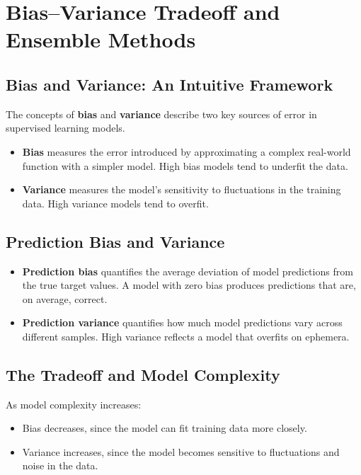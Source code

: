 \documentclass[9pt]{extarticle}
\begin{document}
\section{Bias--Variance Tradeoff and Ensemble Methods}

\subsection{Bias and Variance: An Intuitive Framework}

The concepts of \textbf{bias} and \textbf{variance} describe two key sources of error in supervised learning models.

\begin{itemize}
    \item \textbf{Bias} measures the error introduced by approximating a complex real-world function with a simpler model. High bias models tend to underfit the data.
    \item \textbf{Variance} measures the model's sensitivity to fluctuations in the training data. High variance models tend to overfit.
\end{itemize}


\subsection{Prediction Bias and Variance}

\begin{itemize}
    \item \textbf{Prediction bias} quantifies the average deviation of model predictions from the true target values. A model with zero bias produces predictions that are, on average, correct.
    \item \textbf{Prediction variance} quantifies how much 
    model predictions vary across different samples. 
    High variance reflects a model that overfits on ephemera.
\end{itemize}


\subsection{The Tradeoff and Model Complexity}

As model complexity increases:
\begin{itemize}
    \item Bias decreases, since the model can fit training data more closely.
    \item Variance increases, since the model becomes sensitive to fluctuations and noise in the data.
\end{itemize}
\end{document}
